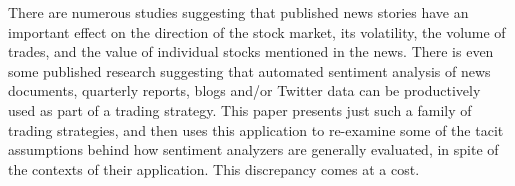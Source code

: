 There are numerous studies suggesting that published news stories have an important effect on the direction of the stock market, its volatility, the volume of trades, and the value of individual stocks mentioned in the news. There is even some published research suggesting that automated sentiment analysis of news documents, quarterly reports, blogs and/or Twitter data can be productively used as part of a trading strategy. This paper presents just such a family of trading strategies, and then uses this application to re-examine some of the tacit assumptions behind how sentiment analyzers are generally evaluated, in spite of the contexts of their application. This discrepancy comes at a cost.
